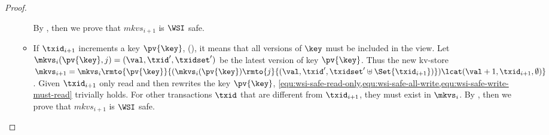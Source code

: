 \begin{proof}
\begin{itemize}
\begin{itemize}
                    By \ih, then we prove that \( mkvs_{i+1} \) is \( \WSI \) safe.
                \item If \( \txid_{i+1}\) increments a key \( \pv{\key} \), \ie \ctrinc(\pv{\key}),
                    it means that all versions of \( \key \) must be included in the view.
                    Let \( \mkvs_i(\pv{\key},j) = (\val, \txid', \txidset') \) be the latest version of key \( \pv{\key} \).
                    Thus the new kv-store \( \mkvs_{i+1} = \mkvs_{i}\rmto{\pv{\key}}{( \mkvs_i(\pv{\key})\rmto{j}{(\val, \txid', \txidset' \uplus \Set{\txid_{i+1}})} ) \lcat (\val+1, \txid_{i+1}, \emptyset) } \).
                    Given \( \txid_{i+1} \) only read and then rewrites the key \( \pv{\key} \), \cref{equ:wsi-safe-read-only,equ:wsi-safe-all-write,equ:wsi-safe-write-must-read} trivially holds.
                    For other transactions \( \txid \) that are different from \( \txid_{i+1} \), they must exist in \( \mkvs_i \).
                    By \ih, then we prove that \( mkvs_{i+1} \) is \( \WSI \) safe.
            \end{itemize}
    \end{itemize}
\end{proof}

